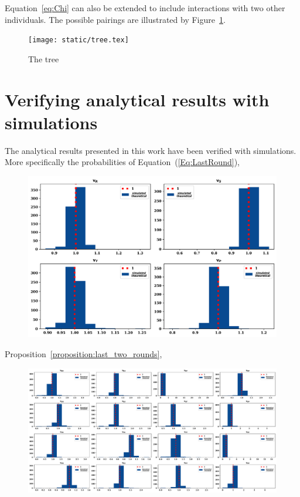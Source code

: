 \documentclass[11pt]{article}
\theoremstyle{plainCl1}
\theoremstyle{plainCl2}
\begin{document}
Equation~\ref{eq:Chi} can also be extended to include interactions with two other
individuals. The possible pairings are illustrated by Figure~\ref{}.


\begin{figure}[!htbp]
  \centering
  \texttt{[image: static/tree.tex]}
  \caption{The tree}\label{fig:two_pairs}
\end{figure}


\section{Verifying analytical results with simulations}

The analytical results presented in this work have been verified with simulations.
More specifically the probabilities of Equation~(\ref{Eq:LastRound}),

\begin{figure}[!htbp]
  \centering
  \includegraphics[width=.75\textwidth]{static/stationary_four.pdf}
\caption{}
\end{figure}

Proposition~\ref{proposition:last_two_rounds},

\begin{figure}[!htbp]
  \centering
  \includegraphics[width=\textwidth]{static/stationary_sixteen.pdf}
\caption{}
\end{figure}
\end{document}
